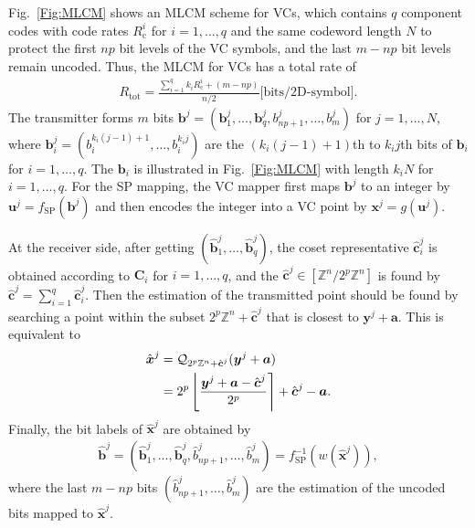\documentclass[journal]{IEEEtran}
\newcommand{\R}{\mathbb{R}}
\newcommand{\Z}{\mathbb{Z}}
\newcommand{\Q}{\mathcal{Q}}
\newcommand{\ba}{\boldsymbol{a}}
\newcommand{\bb}{\boldsymbol{b}}
\newcommand{\bc}{\boldsymbol{c}}
\newcommand{\bu}{\boldsymbol{u}}
\newcommand{\bv}{\boldsymbol{v}}
\newcommand{\bx}{\boldsymbol{x}}
\newcommand{\by}{\boldsymbol{y}}
\newcommand{\bC}{\boldsymbol{C}}
\newcommand{\Rc}{R_\mathrm{c}}
\begin{document}
Fig.~\ref{Fig:MLCM} shows an MLCM scheme for VCs, which contains $q$ component codes with code rates $\Rc^i$ for $i=1,\ldots,q$ and the same codeword length $N$ to protect the first $np$ bit levels of the VC symbols, and the last $m-np$ bit levels remain uncoded. Thus, the MLCM for VCs has a total rate of
\begin{align}
    R_{\text{tot}}= \frac{\sum_{i=1}^qk_i\Rc^i+(m-np)}{n/2} \text{[bits/2D-symbol].}
\end{align}
The transmitter forms $m$ bits $\bb^{j}=(\bb_1^j,\ldots,\bb_q^j,b_{np+1}^j,\dots,b_m^j)$ for $j=1,\ldots,N$, where $\bb_i^j=(b_i^{k_i(j-1)+1},\ldots,b_i^{k_ij})$ are the $(k_i(j-1)+1)$th to $k_ij$th bits of $\bb_i$ for $i=1,\ldots,q$. The $\bb_i$ is illustrated in Fig.~\ref{Fig:MLCM} with length $k_iN$ for $i=1,\ldots,q$. For the SP mapping, the VC mapper first maps $\bb^j$ to an integer by $\bu^j=f_{\text{SP}}(\bb^j)$ and then encodes the integer into a VC point by $\bx^j=g(\bu^j)$. 


At the receiver side, after getting $(\hat{\bb}_1^j,\dots,\hat{\bb}_q^j)$, the coset representative $\hat{\bc}_i^j$ is obtained according to $\bC_i$ for $i=1,\ldots,q$, and the $\hat{\bc}^j\in[\Z^n/2^p\Z^n]$ is found by $\hat{\bc}^j=\sum_{i=1}^q \hat{\bc}_i^j$. Then the estimation of the transmitted point should be found by searching a point within the subset $2^p\Z^n+\hat{\bc}^j$ that is closest to $\by^j+\ba$. This is equivalent to
\begin{align}
    \hat{\bx}^j &=\Q_{2^p\Z^n+\hat{\bc}^j}(\by^j+\ba)\notag\\
    &=2^p\left\lfloor\frac{\by^j+\ba-\hat{\bc}^j}{2^p} \right\rceil+\hat{\bc}^j-\ba.\label{eq:xhat}
\end{align}
Finally, the bit labels of $\hat{\bx}^j$ are obtained by 
\begin{align}\label{eq:bhatSP}
   \hat{\bb}^j=(\hat{\bb}_1^j,\ldots,\hat{\bb}_q^j,\hat{b}_{np+1}^j,\ldots,\hat{b}_m^j)= f_{\text{SP}}^{-1}(w(\hat{\bx}^j)),
\end{align}
where the last $m-np$ bits $(\hat{b}_{np+1}^j,\ldots,\hat{b}_m^j)$ are the estimation of the uncoded bits mapped to $\hat{\bx}^j$.
\end{document}
